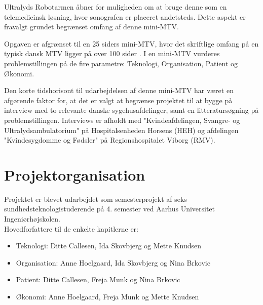 Ultralyds Robotarmen åbner for muligheden om at bruge denne som en telemedicinsk løsning, hvor sonografen er placeret andetsteds. Dette aspekt er fravalgt grundet begrænset omfang af denne mini-MTV. 

Opgaven er afgrænset til en 25 siders mini-MTV, hvor det skriftlige omfang på en typisk dansk MTV ligger på over 100 sider \cite{Leavitt}. I en mini-MTV vurderes problemstillingen på de fire parametre: Teknologi, Organisation, Patient og Økonomi. 

Den korte tidshorisont til udarbejdelsen af denne mini-MTV har været en afgørende faktor for, at det er valgt at begrænse projektet til at bygge på interview med to relevante danske sygehusafdelinger, samt en litteratursøgning på problemstillingen. Interviews er afholdt med "Kvindeafdelingen, Svangre- og Ultralydsambulatorium" på Hospitalsenheden Horsens (HEH) og afdelingen "Kvindesygdomme og Fødsler" på Regionshospitalet Viborg (RMV).

\section{Projektorganisation}
Projektet er blevet udarbejdet som semesterprojekt af seks sundhedsteknologistuderende på 4. semester ved Aarhus Universitet Ingeniørhøjskolen. \\
Hovedforfattere til de enkelte kapitlerne er:
\begin{itemize}
\item Teknologi: Ditte Callesen, Ida Skovbjerg og  Mette Knudsen
\item Organisation: Anne Hoelgaard, Ida Skovbjerg og Nina Brkovic
\item Patient: Ditte Callesen, Freja Munk og Nina Brkovic
\item Økonomi: Anne Hoelgaard, Freja Munk og Mette Knudsen
\end{itemize}

\label{version_Systemark}
